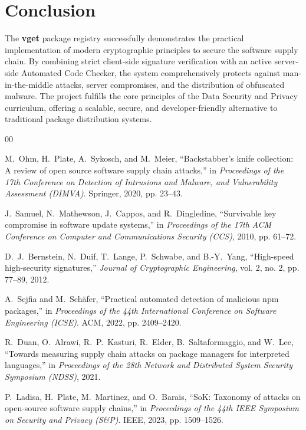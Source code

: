 \documentclass[conference]{IEEEtran}
\begin{document}
\section{Conclusion}
The \textbf{vget} package registry successfully demonstrates the practical implementation of modern cryptographic principles to secure the software supply chain. By combining strict client-side signature verification with an active server-side Automated Code Checker, the system comprehensively protects against man-in-the-middle attacks, server compromises, and the distribution of obfuscated malware. The project fulfills the core principles of the Data Security and Privacy curriculum, offering a scalable, secure, and developer-friendly alternative to traditional package distribution systems.

\begin{thebibliography}{00}

M.~Ohm, H.~Plate, A.~Sykosch, and M.~Meier, ``Backstabber's knife collection: A review of open source software supply chain attacks,'' in \textit{Proceedings of the 17th Conference on Detection of Intrusions and Malware, and Vulnerability Assessment (DIMVA)}. Springer, 2020, pp. 23--43.

J.~Samuel, N.~Mathewson, J.~Cappos, and R.~Dingledine, ``Survivable key compromise in software update systems,'' in \textit{Proceedings of the 17th ACM Conference on Computer and Communications Security (CCS)}, 2010, pp. 61--72.

D.~J.~Bernstein, N.~Duif, T.~Lange, P.~Schwabe, and B.-Y.~Yang, ``High-speed high-security signatures,'' \textit{Journal of Cryptographic Engineering}, vol. 2, no. 2, pp. 77--89, 2012.

A.~Sejfia and M.~Sch\"{a}fer, ``Practical automated detection of malicious npm packages,'' in \textit{Proceedings of the 44th International Conference on Software Engineering (ICSE)}. ACM, 2022, pp. 2409--2420.

R.~Duan, O.~Alrawi, R.~P.~Kasturi, R.~Elder, B.~Saltaformaggio, and W.~Lee, ``Towards measuring supply chain attacks on package managers for interpreted languages,'' in \textit{Proceedings of the 28th Network and Distributed System Security Symposium (NDSS)}, 2021.

P.~Ladisa, H.~Plate, M.~Martinez, and O.~Barais, ``SoK: Taxonomy of attacks on open-source software supply chains,'' in \textit{Proceedings of the 44th IEEE Symposium on Security and Privacy (S\&P)}. IEEE, 2023, pp. 1509--1526.

\end{thebibliography}
\end{document}
